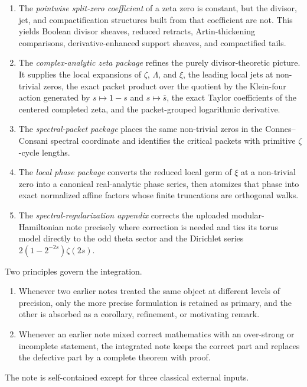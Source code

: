 \documentclass[11pt,a4paper]{article}
\numberwithin{equation}{section}
\theoremstyle{definition}
\theoremstyle{remark}
\begin{document}
\begin{enumerate}[label=(\arabic*)]
\item The \emph{pointwise split-zero coefficient} of a zeta zero is constant, but the divisor, jet, and compactification structures built from that coefficient are not.  This yields Boolean divisor sheaves, reduced retracts, Artin-thickening comparisons, derivative-enhanced support sheaves, and compactified tails.
\item The \emph{complex-analytic zeta package} refines the purely divisor-theoretic picture.  It supplies the local expansions of $\zeta$, $\Lambda$, and $\xi$, the leading local jets at non-trivial zeros, the exact packet product over the quotient by the Klein-four action generated by $s\mapsto 1-s$ and $s\mapsto \overline s$, the exact Taylor coefficients of the centered completed zeta, and the packet-grouped logarithmic derivative.
\item The \emph{spectral-packet package} places the same non-trivial zeros in the Connes--Consani spectral coordinate and identifies the critical packets with primitive $\zeta$-cycle lengths.
\item The \emph{local phase package} converts the reduced local germ of $\xi$ at a non-trivial zero into a canonical real-analytic phase series, then atomizes that phase into exact normalized affine factors whose finite truncations are orthogonal walks.
\item The \emph{spectral-regularization appendix} corrects the uploaded modular-Hamiltonian note precisely where correction is needed and ties its torus model directly to the odd theta sector and the Dirichlet series $2(1-2^{-2s})\zeta(2s)$.
\end{enumerate}

Two principles govern the integration.

\begin{enumerate}[label=(\alph*)]
\item Whenever two earlier notes treated the same object at different levels of precision, only the more precise formulation is retained as primary, and the other is absorbed as a corollary, refinement, or motivating remark.
\item Whenever an earlier note mixed correct mathematics with an over-strong or incomplete statement, the integrated note keeps the correct part and replaces the defective part by a complete theorem with proof.
\end{enumerate}

The note is self-contained except for three classical external inputs.
\end{document}
